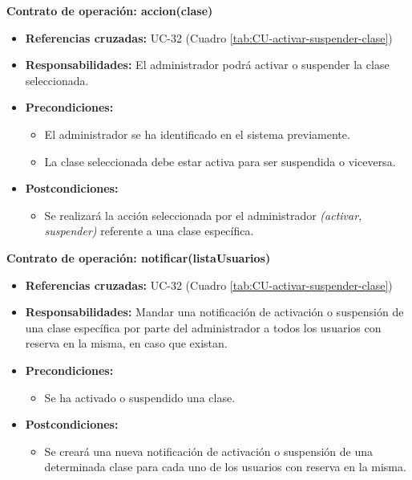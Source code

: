 \textbf{Contrato de operación: accion(clase)}
\begin{itemize}
\item \textbf{Referencias cruzadas:} UC-32 (Cuadro \ref{tab:CU-activar-suspender-clase})
\item \textbf{Responsabilidades:} El administrador podrá activar o suspender la clase seleccionada.
\item \textbf{Precondiciones:} 
 \begin{itemize}
\item El administrador se ha identificado en el sistema previamente.
\item La clase seleccionada debe estar activa para ser suspendida o viceversa.
\end {itemize}
\item \textbf{Postcondiciones:} 
 \begin{itemize}
\item Se realizará la acción seleccionada por el administrador \textit{(activar, suspender)} referente a una clase específica.
\end {itemize}
\end {itemize}

\textbf{Contrato de operación: notificar(listaUsuarios)}
\begin{itemize}
\item \textbf{Referencias cruzadas:} UC-32 (Cuadro \ref{tab:CU-activar-suspender-clase})
\item \textbf{Responsabilidades:} Mandar una notificación de activación o suspensión de una clase específica por parte del administrador a todos los usuarios con reserva en la misma, en caso que existan.
\item \textbf{Precondiciones:} 
 \begin{itemize}
\item Se ha activado o suspendido una clase.
\end {itemize}
\item \textbf{Postcondiciones:} 
 \begin{itemize}
\item Se creará una nueva notificación de activación o suspensión de una determinada clase para cada uno de los usuarios con reserva en la misma.
\end {itemize}
\end {itemize}

